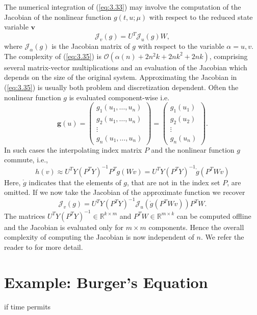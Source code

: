 The numerical integration of (\ref{eq:3.33}) may involve the computation of the Jacobian of the nonlinear function $g(t, u; \mu)$ with respect to the reduced state variable $\mathbf v$
\begin{equation} \label{eq:3.35}
	\mathcal J_{ v}(g) = U^T \mathcal J_{u} (g) W,
\end{equation}
where $\mathcal J_\alpha(g)$ is the Jacobian matrix of $g$ with respect to the variable $\alpha = u,v$. The complexity of (\ref{eq:3.35}) is $\mathcal{O}(\alpha(n) +2n^2k+2nk^2+2nk)$, comprising several matrix-vector multiplications and an evaluation of the Jacobian which depends on the size of the original system. Approximating the Jacobian in (\ref{eq:3.35}) is usually both problem and discretization dependent. Often the nonlinear function $g$ is evaluated component-wise i.e.
\begin{equation} \label{eq:3.36}
	\mathbf g(u) =
	\begin{pmatrix}
		g_1(u_1,\dots,u_n) \\
		g_2(u_1,\dots,u_n) \\
		\vdots \\
		g_n(u_1,\dots,u_n)
	\end{pmatrix}
	=
	\begin{pmatrix}
		g_1(u_1) \\
		g_2(u_2) \\
		\vdots \\
		g_n(u_n)
	\end{pmatrix}.
\end{equation}
In such cases the interpolating index matrix $P$ and the nonlinear function $ g$ commute, i.e.,
\begin{equation} \label{eq:3.37}
	h (v) \approx U^T Y(P^TY)^{-1}P^T g(Wv) = U^T Y(P^TY)^{-1} \mathring g(P^TW v)
\end{equation}
Here, $\mathring g$ indicates that the elements of $g$, that are not in the index set $P$, are omitted. If we now take the Jacobian of the approximate function we recover
\begin{equation} \label{eq:3.38}
	\mathcal J_{v}(g) = U^T Y(P^TY)^{-1} \mathcal J_{u}( \mathring g(P^T W v) ) P^T W.
\end{equation}
The matrices $U^T Y(P^TY)^{-1} \in \mathbb R^{k\times m}$ and $P^TW \in \mathbb R^{m\times k}$ can be computed offline and the Jacobian is evaluated only for $m\times m$ components. Hence the overall complexity of computing the Jacobian is now independent of $n$. We refer the reader to \cite{doi:10.1137/090766498,barrault2004empirical,quarteroni2015reduced,hesthaven2015certified} for more detail.

\section{Example: Burger's Equation}
if time permits

